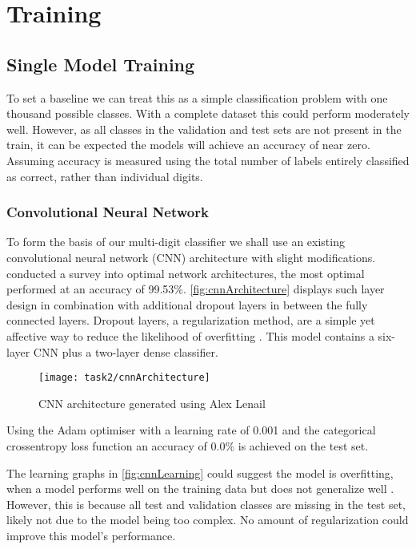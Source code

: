 \chapter{Training}

\section{Single Model Training}
To set a baseline we can treat this as a simple classification problem with one thousand possible classes. With a complete dataset this could perform moderately well. However, as all classes in the validation and test sets are not present in the train, it can be expected the models will achieve an accuracy of near zero. Assuming accuracy is measured using the total number of labels entirely classified as correct, rather than individual digits.

\subsection{Convolutional Neural Network}
To form the basis of our multi-digit classifier we shall use an existing convolutional neural network (CNN) architecture with slight modifications. \autocite{biswasEfficientCNNModel2021} conducted a survey into optimal network architectures, the most optimal performed at an accuracy of 99.53\%. \autoref{fig:cnnArchitecture} displays such layer design in combination with additional dropout layers in between the fully connected layers. Dropout layers, a regularization method, are a simple yet affective way to reduce the likelihood of overfitting \autocite{srivastavaDropoutSimpleWay2014}. This model contains a six-layer CNN plus a two-layer dense classifier.

\begin{figure}[!htbp]
    \centering
    \texttt{[image: task2/cnnArchitecture]}
    \caption[Convolutional Neural Network Architecture]
    {CNN architecture generated using Alex Lenail}
    \label{fig:cnnArchitecture}
\end{figure}

\pagebreak

Using the Adam optimiser with a learning rate of 0.001 and the categorical crossentropy loss function an accuracy of 0.0\% is achieved on the test set.  

The learning graphs in \autoref{fig:cnnLearning} could suggest the model is overfitting, when a model performs well on the training data but does not generalize well \autocite{geronHandsOnMachineLearning2019}. However, this is because all test and validation classes are missing in the test set, likely not due to the model being too complex. No amount of regularization could improve this model's performance. 

